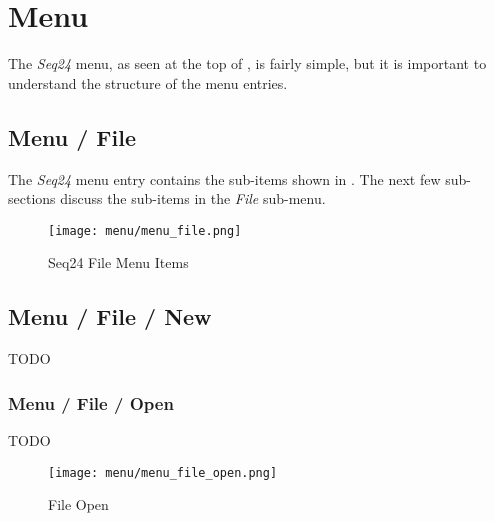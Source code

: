 %
%
%

\section{Menu}
\label{sec:seq24_menu}

   The \textsl{Seq24} menu, as seen at the top of
   ,
   is fairly simple, but it is important to understand the
   structure of the menu entries.

\subsection{Menu / File}
\label{subsec:seq24_menu_file}

   The \textsl{Seq24}
   menu entry contains the sub-items shown in
   .
   The next few sub-sections discuss the sub-items in the 
   \textsl{File} sub-menu.

\begin{figure}[H]
   \centering 
   \texttt{[image: menu/menu\_file.png]}
   \caption{Seq24 File Menu Items}
   \label{fig:seq24_menu_file_items}
\end{figure}

\subsection{Menu / File / New}
\label{subsec:menu_file_new}

   TODO

\subsubsection{Menu / File / Open}
\label{subsubsec:seq24_menu_file_open}

   TODO

\begin{figure}[H]
   \centering 
   \texttt{[image: menu/menu\_file\_open.png]}
   \caption{File Open}
   \label{fig:seq24_menu_file_open}
\end{figure}

